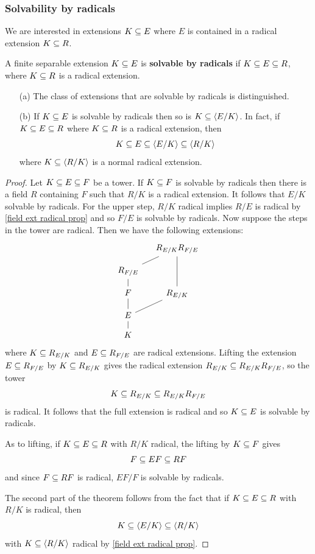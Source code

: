 \subsubsection{Solvability by radicals}
We are interested in extensions $K\subseteq E$ where $E$ is contained in a radical extension $K\subseteq R$.
\begin{definition}
A finite separable extension $K\subseteq E$ is \textbf{solvable by radicals} if $K\subseteq E\subseteq R$, where $K\subseteq R$ is a radical extension.
\end{definition}
\begin{proposition}
\mbox{}
\begin{itemize}
\item[(a)] The class of extensions that are solvable by radicals is distinguished.
\item[(b)] If $K\subseteq E$ is solvable by radicals then so is $K\subseteq\langle E/K\rangle$. In fact, if $K\subseteq E\subseteq R$ where $K\subseteq R$ is a radical extension, then 
\[K\subseteq E\subseteq\langle E/K\rangle\subseteq\langle R/K\rangle\]
where $K\subseteq\langle R/K\rangle$ is a normal radical extension.
\end{itemize}
\end{proposition}
\begin{proof}
Let $K\subseteq E\subseteq F$ be a tower. If $K\subseteq F$ is solvable by radicals then there is a field $R$ containing $F$ such that $R/K$ is a  radical extension. It follows that $E/K$ solvable by radicals. For the upper step, $R/K$ radical implies $R/E$ is radical by \cref{field ext radical prop} and so $F/E$ is solvable by radicals. Now suppose the steps in the tower are radical. Then we have the following extensions:
\[\begin{tikzcd}[column sep=small,row sep=small]
&R_{E/K}R_{F/E}\\
R_{F/E}\ar[ru,no head]&\\
F\ar[u,no head]&R_{E/K}\ar[uu,no head]\\
E\ar[u,no head]\ar[ru,no head]&\\
K\ar[u,no head]
\end{tikzcd}\]
where $K\subseteq R_{E/K}$ and $E\subseteq R_{F/E}$ are radical extensions. Lifting the extension $E\subseteq R_{F/E}$ by $K\subseteq R_{E/K}$ gives the radical extension $R_{E/K}\subseteq R_{E/K}R_{F/E}$, so the tower
\[K\subseteq R_{E/K}\subseteq R_{E/K}R_{F/E}\]
is radical. It follows that the full extension is radical and so $K\subseteq E$ is solvable by radicals.\par
As to lifting, if $K\subseteq E\subseteq R$ with $R/K$ radical, the lifting by $K\subseteq F$ gives
\[F\subseteq EF\subseteq RF\]
and since $F\subseteq RF$ is radical, $EF/F$ is solvable by radicals.\par
The second part of the theorem follows from the fact that if $K\subseteq E\subseteq R$ with $R/K$ is radical, then
\[K\subseteq\langle E/K\rangle\subseteq\langle R/K\rangle\]
with $K\subseteq\langle R/K\rangle$ radical by \cref{field ext radical prop}.
\end{proof}
